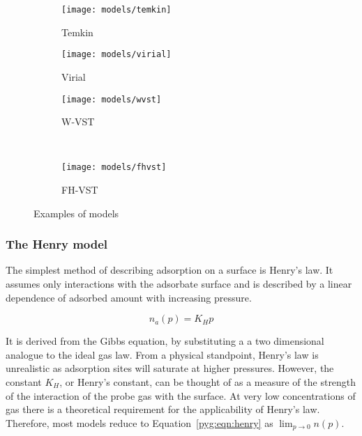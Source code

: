 \begin{figure}[p]
\begin{subfigure}{0.3\linewidth}
		\parbox[c]{1.0\linewidth}{\caption{Temkin}%
			\label{pyg:fgr:temkinex}}

		\parbox[b]{1.0\linewidth}{%

			\texttt{[image: models/temkin]}}
	\end{subfigure}
	\begin{subfigure}{0.3\linewidth}

		\parbox[c]{1.0\linewidth}{\caption{Virial}%
			\label{pyg:fgr:virialex}}

		\parbox[b]{1.0\linewidth}{%

			\texttt{[image: models/virial]}}
	\end{subfigure}
	\begin{subfigure}{0.3\linewidth}

		\parbox[c]{1.0\linewidth}{\caption{W-VST}%
			\label{pyg:fgr:wsvstex}}

		\parbox[b]{1.0\linewidth}{%

			\texttt{[image: models/wvst]}}
	\end{subfigure}
	\\
	\begin{subfigure}{0.3\linewidth}

		\parbox[c]{1.0\linewidth}{\caption{FH-VST}%
			\label{pyg:fgr:fhvstex}}

		\parbox[b]{1.0\linewidth}{%

			\texttt{[image: models/fhvst]}}
	\end{subfigure}

	\caption{Examples of models
	}%
	\label{pyg:fgr:modelex}
\end{figure}

\subsubsection{The Henry model}\label{pyg:models:henry}

The simplest method of describing adsorption on a
surface is Henry’s law. It assumes only interactions
with the adsorbate surface and is described by a
linear dependence of adsorbed amount with
increasing pressure.

\begin{equation}\label{pyg:eqn:henry}
	n_a(p) = K_H p
\end{equation}

It is derived from the Gibbs equation, by substituting a
a two dimensional analogue to the ideal gas law.
From a physical standpoint, Henry's law is unrealistic as adsorption sites
will saturate at higher pressures. However, the constant \(K_H\),
or Henry’s constant, can be thought of as a measure of the strength
of the interaction of the probe gas with the surface. At very
low concentrations of gas there is a
theoretical requirement for the applicability of Henry's law.
Therefore, most models reduce to Equation~\ref{pyg:eqn:henry}
as \(\lim_{p \to 0} n(p)\).

